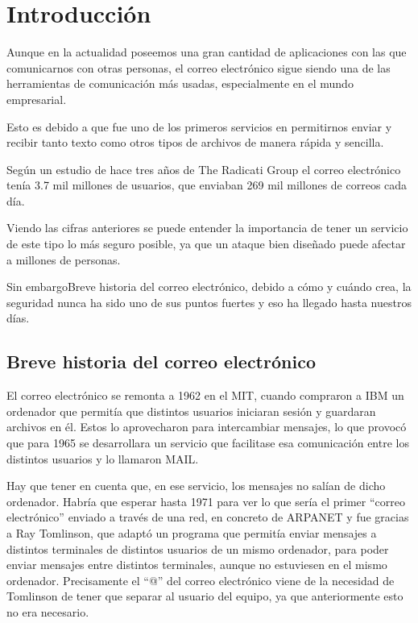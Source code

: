\chapter{Introducción}
Aunque en la actualidad poseemos una gran cantidad de aplicaciones con las que comunicarnos con otras personas, el correo electrónico sigue siendo una de las herramientas de comunicación más usadas, especialmente en el mundo empresarial. 

Esto es debido a que fue uno de los primeros servicios en permitirnos enviar y recibir tanto texto como otros tipos de archivos de manera rápida y sencilla. 

Según un estudio de hace tres años de The Radicati Group el correo electrónico tenía 3.7 mil millones de usuarios, que enviaban 269 mil millones de correos cada día. \cite{cifrasCorreo}

Viendo las cifras anteriores se puede entender la importancia de tener un servicio de este tipo lo más seguro posible, ya que un ataque bien diseñado puede afectar a millones de personas.

Sin embargoBreve historia del correo electrónico, debido a cómo y cuándo crea, la seguridad nunca ha sido uno de sus puntos fuertes y eso ha llegado hasta nuestros días.
 
\section{Breve historia del correo electrónico}
El correo electrónico se remonta a 1962 en el MIT, cuando compraron a IBM un ordenador que permitía que distintos usuarios iniciaran sesión y guardaran archivos en él. Estos lo aprovecharon para intercambiar mensajes, lo que provocó que para 1965 se desarrollara un servicio que facilitase esa comunicación entre los distintos usuarios y lo llamaron MAIL.

Hay que tener en cuenta que, en ese servicio, los mensajes no salían de dicho ordenador. Habría que esperar hasta 1971 para ver lo que sería el primer “correo electrónico” enviado a través de una red, en concreto de ARPANET y fue gracias a Ray Tomlinson, que adaptó un programa que permitía enviar mensajes a distintos terminales de distintos usuarios de un mismo ordenador, para poder enviar mensajes entre distintos terminales, aunque no estuviesen en el mismo ordenador. Precisamente el “@” del correo electrónico viene de la necesidad de Tomlinson de tener que separar al usuario del equipo, ya que anteriormente esto no era necesario.

